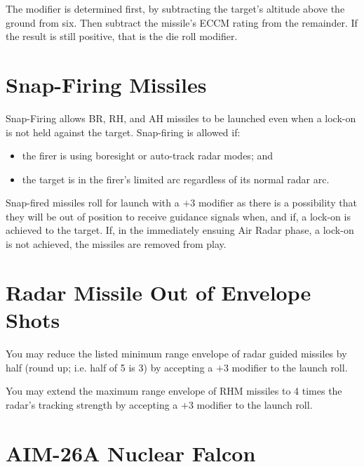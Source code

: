 The modifier is determined first, by subtracting the target's altitude above the ground from six. Then subtract the missile's ECCM rating from the remainder. If the result is still positive, that is the die roll modifier.



\begin{advancedrules}

\section{Snap-Firing Missiles}
\label{rule:snap-firing-missiles}

Snap-Firing allows BR, RH, and AH missiles to be launched even when a lock-on is not held against the target. Snap-firing is allowed if:

\begin{itemize}
    \item the firer is using boresight or auto-track radar modes; and
    \item the target is in the firer's limited arc regardless of its normal radar arc.
\end{itemize}

Snap-fired missiles roll for launch with a $+3$ modifier as there is a possibility that they will be out of position to receive guidance signals when, and if, a lock-on is achieved to the target. If, in the immediately ensuing Air Radar phase, a lock-on is not achieved, the missiles are removed from play.

\section{Radar Missile Out of Envelope Shots}
\label{rule:radar-out-of-envelope-launches}

You may reduce the listed minimum range envelope of radar guided missiles by half (round up; i.e. half of 5 is 3) by accepting a $+3$ modifier to the launch roll.

You may extend the maximum range envelope of RHM missiles to 4 times the radar's tracking strength by accepting a $+3$ modifier to the launch roll.

\section{AIM-26A Nuclear Falcon}


\end{advancedrules}
